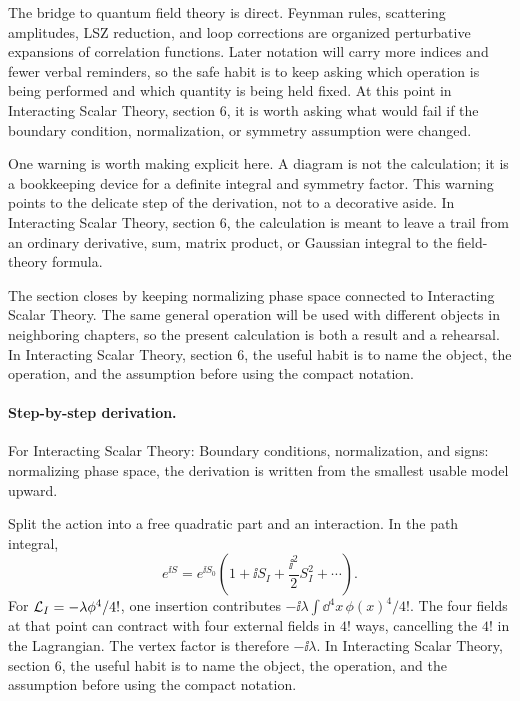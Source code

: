 The bridge to quantum field theory is direct.  Feynman rules, scattering amplitudes, LSZ reduction, and loop corrections are organized perturbative expansions of correlation functions.  Later notation will carry more indices and fewer verbal reminders, so the safe habit is to keep asking which operation is being performed and which quantity is being held fixed.  At this point in Interacting Scalar Theory, section 6, it is worth asking what would fail if the boundary condition, normalization, or symmetry assumption were changed.

One warning is worth making explicit here.  A diagram is not the calculation; it is a bookkeeping device for a definite integral and symmetry factor.  This warning points to the delicate step of the derivation, not to a decorative aside.  In Interacting Scalar Theory, section 6, the calculation is meant to leave a trail from an ordinary derivative, sum, matrix product, or Gaussian integral to the field-theory formula.

The section closes by keeping normalizing phase space connected to Interacting Scalar Theory.  The same general operation will be used with different objects in neighboring chapters, so the present calculation is both a result and a rehearsal.  In Interacting Scalar Theory, section 6, the useful habit is to name the object, the operation, and the assumption before using the compact notation.



\paragraph{Step-by-step derivation.}

For Interacting Scalar Theory: Boundary conditions, normalization, and signs: normalizing phase space, the derivation is written from the smallest usable model upward.

Split the action into a free quadratic part and an interaction.  In the path integral,
\[
  e^{\ii S}=e^{\ii S_0}\left(1+\ii S_I+\frac{\ii^2}{2}S_I^2+\cdots\right).
\]
For \(\mathcal L_I=-\lambda\phi^4/4!\), one insertion contributes \(-\ii\lambda\int\dd^4x\,\phi(x)^4/4!\).  The four fields at that point can contract with four external fields in \(4!\) ways, cancelling the \(4!\) in the Lagrangian.  The vertex factor is therefore \(-\ii\lambda\).  In Interacting Scalar Theory, section 6, the useful habit is to name the object, the operation, and the assumption before using the compact notation.

